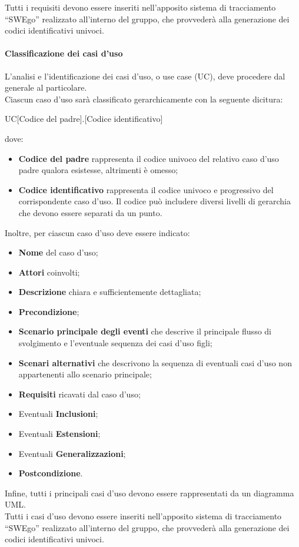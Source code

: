 \documentclass[../NormeDiProgetto.tex]{subfiles}
\begin{document}
				Tutti i requisiti devono essere inseriti nell'apposito sistema di tracciamento ``SWEgo''
				realizzato all'interno del gruppo, che provvederà alla generazione
				dei codici identificativi univoci.
			\paragraph{Classificazione dei casi d'uso\\}
				L'analisi e l'identificazione dei casi d'uso, o use case (UC), deve
				procedere dal generale al particolare.\\
				Ciascun caso d'uso sarà classificato gerarchicamente con la seguente dicitura:
				\begin{center}
					UC[Codice del padre].[Codice identificativo]
				\end{center}
				dove:
				\begin{itemize}
					\item \textbf{Codice del padre} rappresenta il codice univoco
					del relativo caso d'uso padre qualora esistesse, altrimenti è omesso;
					\item \textbf{Codice identificativo} rappresenta il codice
					univoco e progressivo del corrispondente caso d'uso. Il codice
					può includere diversi livelli di gerarchia che devono essere
					separati da un punto.
				\end{itemize}
				Inoltre, per ciascun caso d'uso deve essere indicato:
				\begin{itemize}
					\item \textbf{Nome} del caso d'uso;
					\item \textbf{Attori} coinvolti;
					\item \textbf{Descrizione} chiara e sufficientemente
					dettagliata;
					\item \textbf{Precondizione};
					\item \textbf{Scenario principale degli eventi} che descrive il principale flusso di svolgimento e l'eventuale sequenza dei casi d'uso figli;
					\item \textbf{Scenari alternativi} che descrivono la sequenza
					di eventuali casi d'uso non appartenenti allo scenario
					principale;
					\item \textbf{Requisiti} ricavati dal caso d'uso;
					\item Eventuali \textbf{Inclusioni};
					\item Eventuali \textbf{Estensioni};
					\item Eventuali \textbf{Generalizzazioni};
					\item \textbf{Postcondizione}.
				\end{itemize}
				Infine, tutti i principali casi d'uso devono essere rappresentati da un diagramma UML.\\
				Tutti i casi d'uso devono essere inseriti nell'apposito sistema di tracciamento ``SWEgo''
				realizzato all'interno del gruppo, che provvederà alla generazione
				dei codici identificativi univoci.
\end{document}
